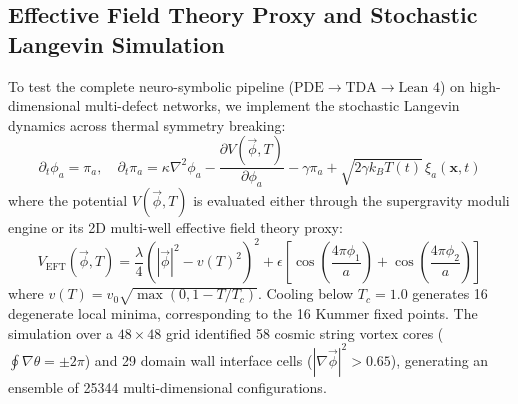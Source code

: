 \documentclass[11pt,a4paper]{article}
\newcommand{\numreconcile}[2]{#1}
\begin{document}
\subsection{Effective Field Theory Proxy and Stochastic Langevin Simulation}
To test the complete neuro-symbolic pipeline ($\text{PDE} \to \text{TDA} \to \text{Lean 4}$) on high-dimensional multi-defect networks, we implement the stochastic Langevin dynamics across thermal symmetry breaking:
\begin{equation}
\label{eq:langevin_eom}
\partial_t \phi_a = \pi_a, \quad
\partial_t \pi_a = \kappa \nabla^2 \phi_a - \frac{\partial V(\vec{\phi}, T)}{\partial \phi_a} - \gamma \pi_a + \sqrt{2 \gamma k_B T(t)} \, \xi_a(\mathbf{x}, t)
\end{equation}
where the potential $V(\vec{\phi}, T)$ is evaluated either through the supergravity moduli engine or its 2D multi-well effective field theory proxy:
\begin{equation}
\label{eq:pheno_potential}
V_{\text{EFT}}(\vec{\phi}, T) = \frac{\lambda}{4}\left( |\vec{\phi}|^2 - v(T)^2 \right)^2 + \epsilon \left[ \cos\left(\frac{4\pi \phi_1}{a}\right) + \cos\left(\frac{4\pi \phi_2}{a}\right) \right]
\end{equation}
where $v(T) = v_0 \sqrt{\max(0, 1 - T/T_c)}$. Cooling below $T_c = 1.0$ generates 16 degenerate local minima, corresponding to the 16 Kummer fixed points. The simulation over a $48 \times 48$ grid identified \numreconcile{58}{cosmic string vortex cores} cosmic string vortex cores ($\oint \nabla \theta = \pm 2\pi$) and \numreconcile{29}{domain wall interface cells} domain wall interface cells ($|\nabla \vec{\phi}|^2 > 0.65$), generating an ensemble of \numreconcile{25344}{multi-dimensional configurations} multi-dimensional configurations.
\end{document}
